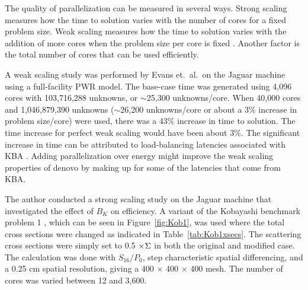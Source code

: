 The quality of parallelization can be measured in several ways. Strong scaling measures how the time to solution varies with the number of cores for a fixed problem size. Weak scaling measures how the time to solution varies with the addition of more cores when the problem size per core is fixed \cite{Bush2010}. Another factor is the total number of cores that can be used efficiently. 

A weak scaling study was performed by Evans et.\ al.\ on the Jaguar machine using a full-facility PWR model. The base-case time was generated using 4,096 cores with 103,716,288 unknowns, or $\sim$25,300 unknowns/core. When 40,000 cores and 1,046,879,390 unknowns ($\sim$26,200 unknowns/core or about a 3\% increase in problem size/core) were used, there was a 43\% increase in time to solution. The time increase for perfect weak scaling would have been about 3\%. The significant increase in time can be attributed to load-balancing latencies associated with KBA \cite{Evans2009d}. Adding parallelization over energy might improve the weak scaling properties of denovo by making up for some of the latencies that come from KBA.

The author conducted a strong scaling study on the Jaguar machine that investigated the effect of $B_{K}$ on efficiency. A variant of the Kobayashi benchmark problem 1 \cite{Kobayashi2000}, which can be seen in Figure~\ref{fig:Kob1}, was used where the total cross sections were changed as indicated in Table~\ref{tab:Kob1xsecs}. The scattering cross sections were simply set to 0.5 $\times \Sigma$ in both the original and modified case. The calculation was done with $S_{16}/P_{0}$, step characteristic spatial differencing, and a 0.25 cm spatial resolution, giving a 400 $\times$ 400 $\times$ 400 mesh.  The number of cores was varied between 12 and 3,600. 

